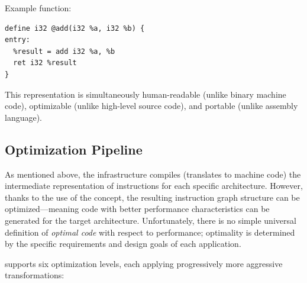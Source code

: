 Example   function:
\begin{lstlisting}[style=ir]
define i32 @add(i32 %a, i32 %b) {
entry:
  %result = add i32 %a, %b
  ret i32 %result
}
\end{lstlisting}

This representation is simultaneously human-readable (unlike binary machine code), optimizable (unlike high-level source code), and portable (unlike assembly language).

\subsection{Optimization Pipeline}
As mentioned above, the  infrastructure compiles (translates to machine code) the intermediate representation of instructions for each specific architecture. However, thanks to the use of the  concept, the resulting instruction graph structure can be optimized—meaning code with better performance characteristics can be generated for the target architecture. Unfortunately, there is no simple universal definition of \textit{optimal code} with respect to performance; optimality is determined by the specific requirements and design goals of each application.

 supports six optimization levels, each applying progressively more aggressive transformations:

